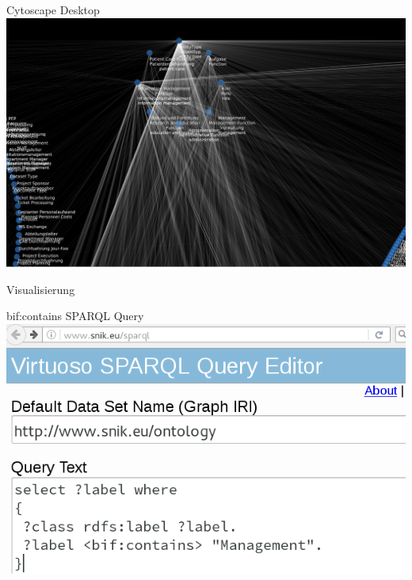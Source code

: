 \documentclass[14pt,aspectratio=1610]{beamer}
\begin{document}
\begin{frame}{Cytoscape Desktop}
\centering\includegraphics[width=\textwidth,height=\textheight,keepaspectratio]{img/types_classrelations_zoomed.png}
\end{frame}


\begin{frame}{Visualisierung}
\begin{block}{bif:contains SPARQL Query}
\centering\includegraphics[width=\textwidth,height=0.7\textheight,keepaspectratio]{img/bifcontains-query.png}
\end{block}
\end{frame}
\end{document}
